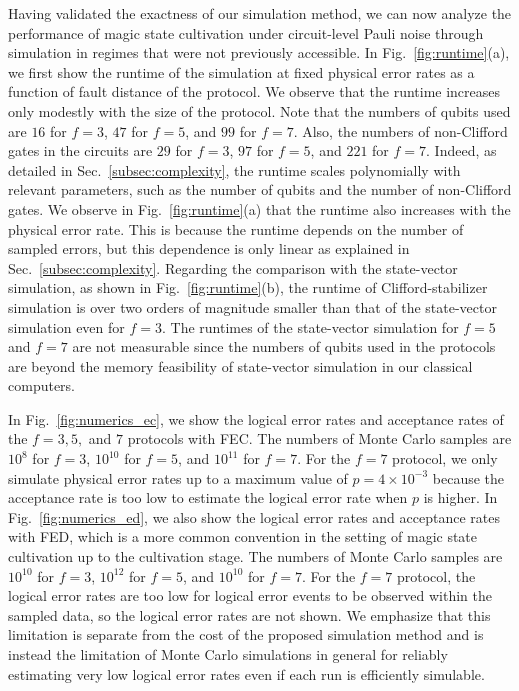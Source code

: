 \documentclass[
 reprint,
 amsmath,amssymb,
 pra,superscriptaddress, nofootinbib
]{revtex4-2}
\theoremstyle{definition}
\theoremstyle{plain}
\begin{document}
Having validated the exactness of our simulation method, we can now analyze the performance of magic state cultivation under circuit-level Pauli noise through simulation in regimes that were not previously accessible. 
In Fig.~\ref{fig:runtime}(a), we first show the runtime of the simulation at fixed physical error rates as a function of fault distance of the protocol.
We observe that the runtime increases only modestly with the size of the protocol. 
Note that the numbers of qubits used are $16$ for $f=3$, $47$ for $f=5$, and $99$ for $f=7$. Also, the numbers of non-Clifford gates in the circuits are $29$ for $f=3$, $97$ for $f=5$, and $221$ for $f=7$. 
Indeed, as detailed in Sec.~\ref{subsec:complexity}, the runtime scales polynomially with relevant parameters, such as the number of qubits and the number of non-Clifford gates. 
We observe in Fig.~\ref{fig:runtime}(a) that the runtime also increases with the physical error rate. This is because the runtime depends on the number of sampled errors, but this dependence is only linear as explained in Sec.~\ref{subsec:complexity}.
Regarding the comparison with the state-vector simulation, as shown in Fig.~\ref{fig:runtime}(b), the runtime of Clifford-stabilizer simulation is over two orders of magnitude smaller than that of the state-vector simulation even for $f=3$. 
The runtimes of the state-vector simulation for $f=5$ and $f=7$ are not measurable since the numbers of qubits used in the protocols are beyond the memory feasibility of state-vector simulation in our classical computers. 

In Fig.~\ref{fig:numerics_ec}, we show the logical error rates and acceptance rates of the $f=3,5,$ and $7$ protocols with FEC. The numbers of Monte Carlo samples are $10^{8}$ for $f=3$, $10^{10}$ for $f=5$, and $10^{11}$ for $f=7$. For the $f=7$ protocol, we only simulate physical error rates up to a maximum value of $p=4\times10^{-3}$ because the acceptance rate is too low to estimate the logical error rate when $p$ is higher. 
In Fig.~\ref{fig:numerics_ed}, we also show the logical error rates and acceptance rates with FED, which is a more common convention in the setting of magic state cultivation up to the cultivation stage.
The numbers of Monte Carlo samples are $10^{10}$ for $f=3$, $10^{12}$ for $f=5$, and $10^{10}$ for $f=7$. 
For the $f=7$ protocol, the logical error rates are too low for logical error events to be observed within the sampled data, so the logical error rates are not shown. 
We emphasize that this limitation is separate from the cost of the proposed simulation method and is instead the limitation of Monte Carlo simulations in general for reliably estimating very low logical error rates even if each run is efficiently simulable.
\end{document}
